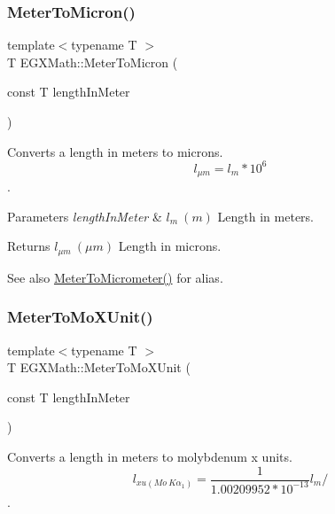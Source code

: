 \subsubsection{\texorpdfstring{Meter\+To\+Micron()}{MeterToMicron()}}
{\footnotesize\ttfamily template$<$typename T $>$ \\
T E\+G\+X\+Math\+::\+Meter\+To\+Micron (\begin{DoxyParamCaption}\item[{const T}]{length\+In\+Meter }\end{DoxyParamCaption})}



Converts a length in meters to microns. \[ l_{\mu m}=l_{m} * 10^{6} \]. 


\begin{DoxyParams}{Parameters}
{\em length\+In\+Meter} & $ l_{m}\ (m)$ Length in meters. \\
\hline
\end{DoxyParams}
\begin{DoxyReturn}{Returns}
$ l_{\mu m}\ (\mu m)$ Length in microns. 
\end{DoxyReturn}
\begin{DoxySeeAlso}{See also}
\mbox{\hyperlink{group___e_g_x_math-_conversions-_length_conversions-_meter-_s_i_gac0114c26af780ce603948df83f5e338e}{Meter\+To\+Micrometer()}} for alias. 
\end{DoxySeeAlso}
\mbox{\label{group___e_g_x_math-_conversions-_length_conversions-_meter-_non-_s_i_gae0351200a3d90c4efe741c6057b2fd4b}} 
\subsubsection{\texorpdfstring{Meter\+To\+Mo\+X\+Unit()}{MeterToMoXUnit()}}
{\footnotesize\ttfamily template$<$typename T $>$ \\
T E\+G\+X\+Math\+::\+Meter\+To\+Mo\+X\+Unit (\begin{DoxyParamCaption}\item[{const T}]{length\+In\+Meter }\end{DoxyParamCaption})}



Converts a length in meters to molybdenum x units. \[ l_{xu(Mo\ K\alpha_1)}=\frac{1}{1.00209952*10^{-13}} l_{m} / \]. 


